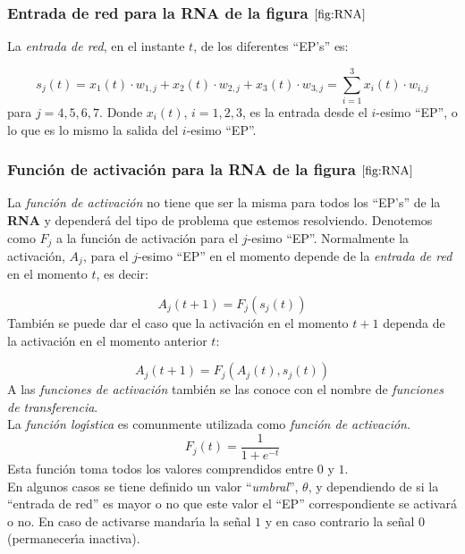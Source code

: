 \subsubsection{Entrada de red para la \textbf{RNA} de la figura $\ref{fig:RNA}$}

La \emph{entrada de red}, en el instante $t$, de los diferentes ``EP's'' es:

\begin{displaymath}
s_j(t)=x_1(t)\cdot w_{1,j}+x_2(t)\cdot w_{2,j}+x_3(t)\cdot w_{3,j} =\sum_{i=1}^3
x_i(t)\cdot w_{i,j}
\end{displaymath}
para $j=4,5,6,7$. Donde $x_i(t)$, $i=1,2,3$, es la entrada desde el $i$-esimo
``EP'', o lo que es lo mismo la salida del $i$-esimo ``EP''.

\subsubsection{Funci\'on de activaci\'on para la \textbf{RNA} de la figura
$\ref{fig:RNA}$}

La \emph{funci\'on de activaci\'on} no tiene que ser la misma para todos los
``EP's'' de la \textbf{RNA} y depender\'a del tipo de problema que estemos
resolviendo. Denotemos como $F_j$ a la funci\'on de activaci\'on para el
$j$-esimo ``EP''. Normalmente la activaci\'on, $A_j$, para el $j$-esimo ``EP''
en el momento depende de la \emph{entrada de red} en el momento $t$, es decir:

\begin{displaymath}
A_j(t+1) = F_j(s_j(t))
\end{displaymath}
Tambi\'en se puede dar el caso que la activaci\'on en el momento $t+1$ dependa
de la activaci\'on en el momento anterior $t$:

\begin{displaymath}
A_j(t+1)=F_j(A_j(t),s_j(t))
\end{displaymath}
A las \emph{funciones de activaci\'on} tambi\'en se las conoce con el nombre de 
\emph{funciones de transferencia}.\\

La \emph{funci\'on log\'{\i}stica} es comunmente utilizada como \emph{funci\'on de activaci\'on}.
\begin{displaymath}
F_j(t)=\frac{1}{1+e^{-t}}
\end{displaymath}
Esta funci\'on toma todos los valores comprendidos entre $0$ y $1$.\\

En algunos casos se tiene definido un valor ``\emph{umbral}'', $\theta$, y
dependiendo de si la ``entrada de red'' es mayor o no que este valor el ``EP''
correspondiente se activar\'a o no. En caso de activarse mandar\'{\i}a la 
se\~nal $1$ y en caso contrario la se\~nal $0$(permanecer\'{\i}a inactiva).

